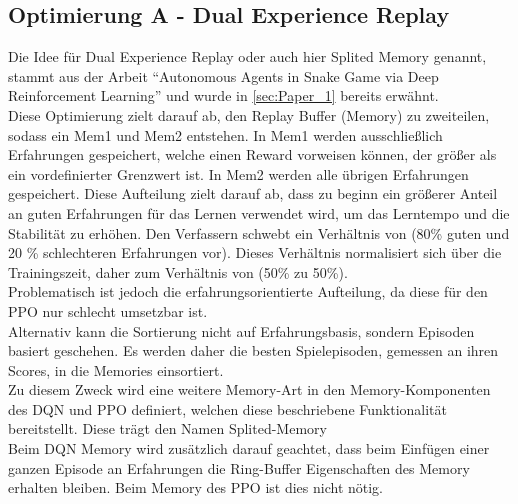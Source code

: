 \subsection{Optimierung A - Dual Experience Replay} \label{sec:Konzept_Optimierung01}
Die Idee für Dual Experience Replay oder auch hier Splited Memory genannt, stammt aus der Arbeit "`Autonomous Agents in Snake Game via Deep Reinforcement Learning"' \cite{Autonomous_Agents_in_Snake_Game_via_DRL} und wurde in \ref{sec:Paper_1} bereits erwähnt.\\
Diese Optimierung zielt darauf ab, den Replay Buffer (Memory) zu zweiteilen, sodass ein Mem1 und Mem2 entstehen. In Mem1 werden ausschließlich Erfahrungen gespeichert, welche einen Reward vorweisen können, der größer als ein vordefinierter Grenzwert ist. In Mem2 werden alle übrigen Erfahrungen gespeichert. Diese Aufteilung zielt darauf ab, dass zu beginn ein größerer Anteil an guten Erfahrungen für das Lernen verwendet wird, um das Lerntempo und die Stabilität zu erhöhen. Den Verfassern schwebt ein Verhältnis von (80\% guten und 20 \% schlechteren Erfahrungen vor). Dieses Verhältnis normalisiert sich über die Trainingszeit, daher zum Verhältnis von (50\% zu 50\%).\\
Problematisch ist jedoch die erfahrungsorientierte Aufteilung, da diese für den PPO nur schlecht umsetzbar ist.\\
Alternativ kann die Sortierung nicht auf Erfahrungsbasis, sondern Episoden basiert geschehen. Es werden daher die besten Spielepisoden, gemessen an ihren Scores, in die Memories einsortiert.\\
Zu diesem Zweck wird eine weitere Memory-Art in den Memory-Komponenten des DQN und PPO definiert, welchen diese beschriebene Funktionalität bereitstellt. Diese trägt den Namen Splited-Memory\\
Beim DQN Memory wird zusätzlich darauf geachtet, dass beim Einfügen einer ganzen Episode an Erfahrungen die Ring-Buffer Eigenschaften des Memory erhalten bleiben. Beim Memory des PPO ist dies nicht nötig.


